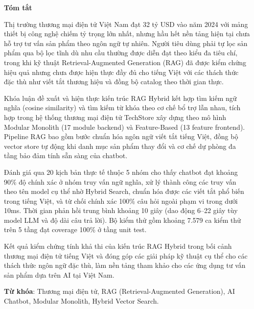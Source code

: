 \begin{center}
\textbf{\large{Tóm tắt}}
\end{center}

\begin{small}

Thị trường thương mại điện tử Việt Nam đạt 32 tỷ USD vào năm 2024 với mảng thiết bị công nghệ chiếm tỷ trọng lớn nhất, nhưng hầu hết nền tảng hiện tại chưa hỗ trợ tư vấn sản phẩm theo ngôn ngữ tự nhiên. Người tiêu dùng phải tự lọc sản phẩm qua bộ lọc tĩnh dù nhu cầu thường được diễn đạt theo kiểu đa tiêu chí, trong khi kỹ thuật Retrieval-Augmented Generation (RAG) đã được kiểm chứng hiệu quả nhưng chưa được hiện thực đầy đủ cho tiếng Việt với các thách thức đặc thù như viết tắt thương hiệu và đồng bộ catalog theo thời gian thực.

Khóa luận đề xuất và hiện thực kiến trúc RAG Hybrid kết hợp tìm kiếm ngữ nghĩa (cosine similarity) và tìm kiếm từ khóa theo cơ chế bổ trợ lẫn nhau, tích hợp trong hệ thống thương mại điện tử TechStore xây dựng theo mô hình Modular Monolith (17 module backend) và Feature-Based (13 feature frontend). Pipeline RAG bao gồm bước chuẩn hóa ngôn ngữ viết tắt tiếng Việt, đồng bộ vector store tự động khi danh mục sản phẩm thay đổi và cơ chế dự phòng đa tầng bảo đảm tính sẵn sàng của chatbot.

Đánh giá qua 20 kịch bản thực tế thuộc 5 nhóm cho thấy chatbot đạt khoảng 90\% độ chính xác ở nhóm truy vấn ngữ nghĩa, xử lý thành công các truy vấn theo tên model cụ thể nhờ Hybrid Search, chuẩn hóa được các viết tắt phổ biến trong tiếng Việt, và từ chối chính xác 100\% câu hỏi ngoài phạm vi trong dưới 10ms. Thời gian phản hồi trung bình khoảng 10 giây (dao động 6--22 giây tùy model LLM và độ dài câu trả lời). Bộ kiểm thử gồm khoảng 7.579 ca kiểm thử trên 5 tầng đạt coverage 100\% ở tầng unit test.

Kết quả kiểm chứng tính khả thi của kiến trúc RAG Hybrid trong bối cảnh thương mại điện tử tiếng Việt và đóng góp các giải pháp kỹ thuật cụ thể cho các thách thức ngôn ngữ đặc thù, làm nền tảng tham khảo cho các ứng dụng tư vấn sản phẩm dựa trên AI tại Việt Nam.

\vspace*{0.5cm}
\textbf{Từ khóa}: Thương mại điện tử, RAG (Retrieval-Augmented Generation), AI Chatbot, Modular Monolith, Hybrid Vector Search.

\end{small}
